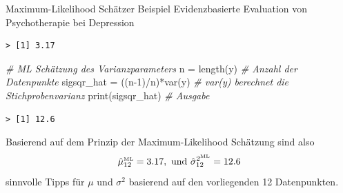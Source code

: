 \documentclass[
  8pt,
  ignorenonframetext,
]{beamer}
\newenvironment{Shaded}{\begin{snugshade}}{\end{snugshade}}
\newcommand{\AttributeTok}[1]{\textcolor[rgb]{0.77,0.63,0.00}{#1}}
\newcommand{\CommentTok}[1]{\textcolor[rgb]{0.56,0.35,0.01}{\textit{#1}}}
\newcommand{\DecValTok}[1]{\textcolor[rgb]{0.00,0.00,0.81}{#1}}
\newcommand{\FunctionTok}[1]{\textcolor[rgb]{0.00,0.00,0.00}{#1}}
\newcommand{\NormalTok}[1]{#1}
\newcommand{\OtherTok}[1]{\textcolor[rgb]{0.56,0.35,0.01}{#1}}
\newcommand{\SpecialCharTok}[1]{\textcolor[rgb]{0.00,0.00,0.00}{#1}}
\newcommand{\StringTok}[1]{\textcolor[rgb]{0.31,0.60,0.02}{#1}}
\begin{document}
\begin{frame}[fragile,t]{Maximum-Likelihood Schätzer}
\protect\hypertarget{maximum-likelihood-schuxe4tzer-14}{}
Beispiel \textbar{} Evidenzbasierte Evaluation von Psychotherapie bei
Depression \vspace{2mm} \footnotesize

\begin{Shaded}
\end{Shaded}

\begin{verbatim}
> [1] 3.17
\end{verbatim}

\vspace{2mm}

\begin{Shaded}
\begin{Highlighting}[]
\CommentTok{\# ML Schätzung des Varianzparameters}
\NormalTok{n           }\OtherTok{=} \FunctionTok{length}\NormalTok{(y)                      }\CommentTok{\# Anzahl der Datenpunkte}
\NormalTok{sigsqr\_hat  }\OtherTok{=}\NormalTok{ ((n}\DecValTok{{-}1}\NormalTok{)}\SpecialCharTok{/}\NormalTok{n)}\SpecialCharTok{*}\FunctionTok{var}\NormalTok{(y)               }\CommentTok{\# var(y) berechnet die Stichprobenvarianz}
\FunctionTok{print}\NormalTok{(sigsqr\_hat)                            }\CommentTok{\# Ausgabe}
\end{Highlighting}
\end{Shaded}

\begin{verbatim}
> [1] 12.6
\end{verbatim}

\footnotesize

Basierend auf dem Prinzip der Maximum-Likelihood Schätzung sind also
\begin{equation}
\hat{\mu}_{12}^{\mbox{\tiny ML}} = 3.17,
\mbox{ und }
\hat{\sigma}^{2^{\mbox{\tiny ML}}}_{12} = 12.6
\end{equation} sinnvolle Tipps für \(\mu\) und \(\sigma^2\) basierend
auf den vorliegenden 12 Datenpunkten.
\end{frame}
\end{document}
